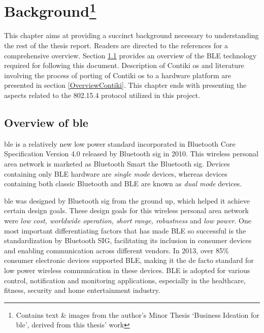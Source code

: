 \chapter[Background]{Background\footnote{Contains text \& images from the author's Minor Thesis `Business Ideation for \gls{ble}', derived from this thesis' work}} \label{2Back}

This chapter aims at providing a succinct background necessary to understanding the rest of the thesis report. Readers are directed to the references for a comprehensive overview. Section \ref{OverviewBLE} provides an overview of the BLE technology required for following this document. Description of Contiki \gls{os} and literature involving the process of porting of Contiki \gls{os} to a hardware platform are presented in section \ref{OverviewContiki}. This chapter ends with presenting the aspects related to the 802.15.4 protocol utilized in this project.


\section{Overview of \acrlong{ble}} \label{OverviewBLE}

\acrfull{ble} is a relatively new low power standard incorporated in Bluetooth Core Specification Version 4.0 released by Bluetooth \gls{sig} in 2010\cite{CoreSpec4.0}. This wireless personal area network is marketed as Bluetooth Smart the Bluetooth \gls{sig}. Devices containing only BLE hardware are \emph{single mode} devices, whereas devices containing both classic Bluetooth and BLE are known as \emph{dual mode} devices.   

\gls{ble} was designed by Bluetooth \gls{sig} from the ground up, which helped it achieve certain design goals. These design goals for this wireless personal area network were \emph{low cost, worldwide operation, short range, robustness} and \emph{low power}\cite{Heydon2012}. One most important differentiating factors that has made BLE so successful is the standardization by Bluetooth SIG, facilitating its inclusion in consumer devices and enabling communication across different vendors. In 2013, over 85\% consumer electronic devices supported BLE, making it the de facto standard for low power wireless communication in these devices\cite{Martin2014}. BLE is adopted for various control, notification and monitoring applications, especially in the healthcare, fitness, security and home entertainment industry. 

